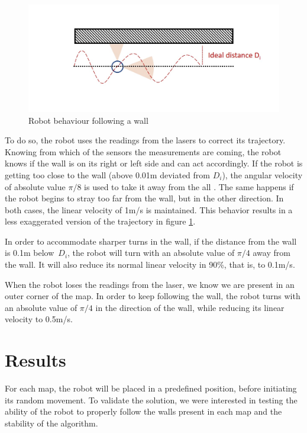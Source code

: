 \documentclass[10pt,journal,compsoc]{IEEEtran}
\begin{document}
\begin{figure}[thpb]
\centering
\includegraphics[scale=0.3]{img/behaviour.jpg}
\caption{Robot behaviour following a wall}
\label{fig:wall}
\end{figure}

To do so, the robot uses the readings from the lasers to correct its trajectory. Knowing from which of the sensors the measurements are coming, the robot knows if the wall is on its right or left side and can act accordingly. If the robot is getting too close to the wall (above 0.01m deviated from $D_i$), the angular velocity of absolute value $\pi/8$ is used to take it away from the all . The same happens if the robot begins to stray too far from the wall, but in the other direction. In both cases, the linear velocity of 1m/s is maintained. This behavior results in a less exaggerated version of the trajectory in figure \ref{fig:wall}.

In order to accommodate sharper turns in the wall, if the distance from the wall is 0.1m below~$D_i$, the robot will turn with an absolute value of $\pi/4$ away from the wall. It will also reduce its normal linear velocity in 90\%, that is, to 0.1m/s.

When the robot loses the readings from the laser, we know we are present in an outer corner of the map. In order to keep following the wall, the robot turns with an absolute value of $\pi/4$ in the direction of the wall, while reducing its linear velocity to 0.5m/s.

\section{Results}
For each map, the robot will be placed in a predefined position, before initiating its random movement. To validate the solution, we were interested in testing the ability of the robot to properly follow the walls present in each map and the stability of the algorithm.
\end{document}
